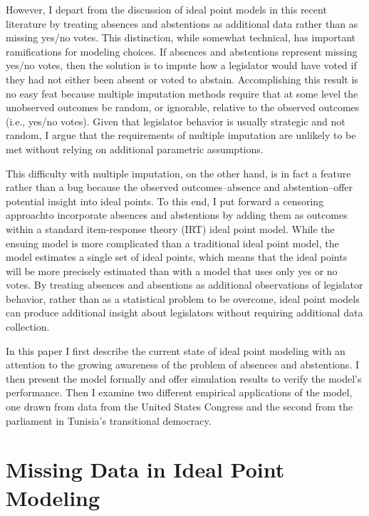 	However, I depart from the discussion of ideal point models in this recent literature by treating absences and abstentions as additional data rather than as missing yes/no votes. This distinction, while somewhat technical, has important ramifications for modeling choices. If absences and abstentions represent missing yes/no votes, then the solution is to impute how a legislator would have voted if they had not either been absent or voted to abstain. Accomplishing this result is no easy feat because multiple imputation methods require that at some level the unobserved outcomes be random, or ignorable, relative to the observed outcomes (i.e., yes/no votes). Given that legislator behavior is usually strategic and not random, I argue that the requirements of multiple imputation are unlikely to be met without relying on additional parametric assumptions. 
	
	This difficulty with multiple imputation, on the other hand, is in fact a feature rather than a bug because the observed outcomes--absence and abstention--offer potential insight into ideal points. To this end, I put forward a censoring approachto incorporate absences and abstentions by adding them as outcomes within a standard item-response theory (IRT) ideal point model. While the ensuing model is more complicated than a traditional ideal point model, the model estimates a single set of ideal points, which means that the ideal points will be more precisely estimated than with a model that uses only yes or no votes. By treating absences and absentions as additional observations of legislator behavior, rather than as a statistical problem to be overcome, ideal point models can produce additional insight about legislators without requiring additional data collection.
	
	In this paper I first describe the current state of ideal point modeling with an attention to the growing awareness of the problem of absences and abstentions. I then present the model formally and offer simulation results to verify the model's performance. Then I examine two different empirical applications of the model, one drawn from data from the United States Congress and the second from the parliament in Tunisia's transitional democracy.
	
	\section*{Missing Data in Ideal Point Modeling}
	
